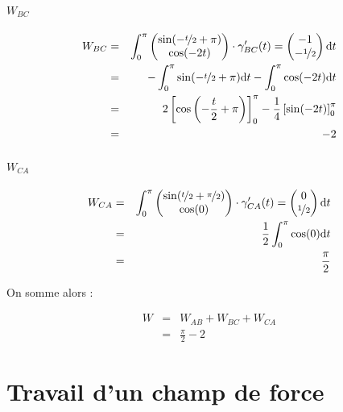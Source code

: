 \documentclass[a4paper, 11pt]{report} %
\newcommand{\dt}{\mathrm{d}t}
\begin{document}
\paragraph{$W_{BC}$}

\begin{eqnarray*}
W_{BC} & = &
\int_0^\pi
\begin{pmatrix}
\sin(-\nicefrac{t}{2}+\pi)\\
\cos(-2t)
\end{pmatrix} 
\cdot
\gamma'_{BC}(t) =
\begin{pmatrix}
-1\\
-\nicefrac{1}{2}
\end{pmatrix}
\dt\\
& = & -\int_0^\pi\sin(-\nicefrac{t}{2}+\pi)\dt-\int_0^\pi\cos(-2t)\dt\\
& = & 2\left[\cos\left(-\frac{t}{2}+\pi\right)\right]_0^\pi - \frac{1}{4}\left[\sin(-2t)\right]_0^\pi\\
& = & -2
\end{eqnarray*}

\paragraph{$W_{CA}$}

\begin{eqnarray*}
W_{CA} & = &
\int_0^\pi
\begin{pmatrix}
\sin(\nicefrac{t}{2} +\nicefrac{\pi}{2})\\
\cos(0)
\end{pmatrix}
\cdot
\gamma'_{CA}(t) =
\begin{pmatrix}
0\\
\nicefrac{1}{2}
\end{pmatrix}
\dt\\
& = & \frac{1}{2}\int_0^\pi\cos(0)\dt\\
& = & \frac{\pi}{2}
\end{eqnarray*}


On somme alors :

\begin{eqnarray*}
W & = & W_{AB} + W_{BC} + W_{CA}\\
& = & \frac{\pi}{2} - 2
\end{eqnarray*}

\section{Travail d'un champ de force} %
\end{document}
